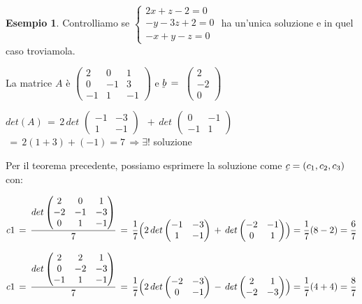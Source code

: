 \documentclass[a4paper]{report}
\theoremstyle{remark}
\theoremstyle{definition}
\newtheorem{es}{Esempio}
\newcommand{\uvec}[2][3]{\underline{#2\mkern-#1mu}\mkern#1mu}
\begin{document}
\begin{es}
	Controlliamo se $
	\begin{cases}
		2x+z-2=0\\
		-y-3z+2=0\\
		-x+y-z=0
	\end{cases}
	$ ha un'unica soluzione e in quel caso troviamola.
	
	La matrice $ A $ è $
	\begin{pmatrix}
		2 & 0 & 1\\
		0 & -1 & 3\\
		-1 & 1 & -1
	\end{pmatrix}$
	e $ \uvec b\,=\,$
	$\begin{pmatrix}
		2\\-2\\0
	\end{pmatrix}$
	
	$ det(A)\,=\,2\,det $
	$\begin{pmatrix}
		-1 & -3\\
		1 & -1
	\end{pmatrix}$
	$\,+\, det$
	$\begin{pmatrix}
		0 & -1\\
		-1 & 1
	\end{pmatrix}$
	$ \,=\,2(1+3)+(-1)=7\, \Rightarrow\exists !$  soluzione
	
	Per il teorema precedente, possiamo esprimere la soluzione come $\uvec{c}=(c_1,c_2,c_3)$ con:
	
	$ c1\,=\,\dfrac{det
	\begin{pmatrix}
		2 & 0 & 1\\
		-2 & -1 & -3\\
		0 & 1 & -1
	\end{pmatrix}}{7} 
	\,=\,\dfrac{1}{7}\Bigl( 2\,det
	\begin{pmatrix}
		-1 & -3\\
		1 & -1
	\end{pmatrix}
	\,+\,det
	\begin{pmatrix}
		-2 & -1\\
		0 & 1
	\end{pmatrix}\Bigr)
	= \dfrac{1}{7}(8-2)=\dfrac{6}{7}$
	
	$ c1\,=\,\dfrac{det
	\begin{pmatrix}
		2 & 2 & 1\\
		0 & -2 & -3\\
		-1 & 1 & -1
	\end{pmatrix}}{7} 
	\,=\,\dfrac{1}{7}\Bigl( 2\,det
	\begin{pmatrix}
		-2 & -3\\
		0 & -1
	\end{pmatrix}
	\,-\,det
	\begin{pmatrix}
		2 & 1\\
		-2 & -3
	\end{pmatrix}\Bigr)
	= \dfrac{1}{7}(4+4)=\dfrac{8}{7}$
	

\end{es}
\end{document}
